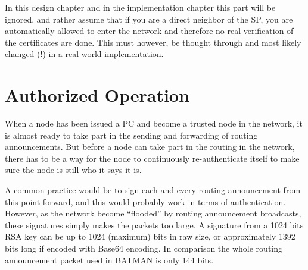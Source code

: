 In this design chapter and in the implementation chapter this part will be
ignored, and rather assume that if you are a direct neighbor of the \ac{SP}, you
are automatically allowed to enter the network and therefore no real
verification of the certificates are done. This must however, be thought through
and most likely changed (!) in a real-world implementation.

\section{Authorized Operation}



When a node has been issued a \ac{PC} and become a trusted node in the network,
it is almost ready to take part in the sending and forwarding of routing
announcements. But before a node can take part in the routing in the network,
there has to be a way for the node to continuously re-authenticate itself to make
sure the node is still who it says it is.

A common practice would be to sign each and every routing announcement from this
point forward, and this would probably work in terms of authentication. However,
as the network become ``flooded'' by routing announcement broadcasts, these
signatures simply makes the packets too large. A signature from a 1024 bits RSA
key can be up to 1024 (maximum) bits in raw size, or approximately 1392 bits
long if encoded with Base64 encoding. In comparison the whole routing announcement packet used
in BATMAN is only 144 bits.

